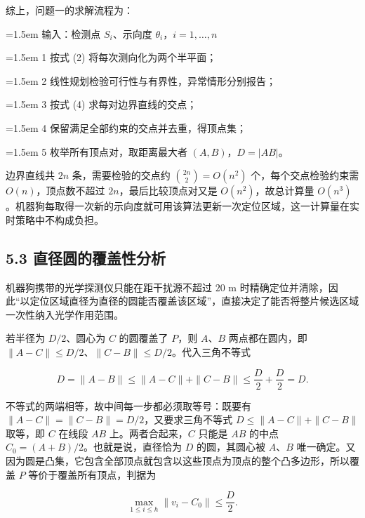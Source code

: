 \documentclass[UTF8,a4paper,zihao=-4,fontset=fandol]{ctexart}
\begin{document}
综上，问题一的求解流程为：

\begin{tcolorbox}[colback=black!2,colframe=black!22,boxrule=0.4pt,arc=0pt,left=9pt,right=9pt,top=7pt,bottom=7pt]
\small\setlength{\parskip}{2pt}
\noindent\hangindent=1.5em 输入：检测点 $S_i$、示向度 $\theta_i$，$i=1,\dots,n$\par
\noindent\hangindent=1.5em 1  按式 (2) 将每次测向化为两个半平面；\par
\noindent\hangindent=1.5em 2  线性规划检验可行性与有界性，异常情形分别报告；\par
\noindent\hangindent=1.5em 3  按式 (4) 求每对边界直线的交点；\par
\noindent\hangindent=1.5em 4  保留满足全部约束的交点并去重，得顶点集；\par
\noindent\hangindent=1.5em 5  枚举所有顶点对，取距离最大者 $(A,B)$，$D=|AB|$。\par
\end{tcolorbox}

边界直线共 $2n$ 条，需要检验的交点约 $\binom{2n}{2}=O(n^2)$ 个，每个交点检验约束需 $O(n)$，顶点数不超过 $2n$，最后比较顶点对又是 $O(n^2)$，故总计算量 $O(n^3)$。机器狗每取得一次新的示向度就可用该算法更新一次定位区域，这一计算量在实时策略中不构成负担。

\subsection*{5.3 直径圆的覆盖性分析}

机器狗携带的光学探测仪只能在距干扰源不超过 $20$ m 时精确定位并清除，因此“以定位区域直径为直径的圆能否覆盖该区域”，直接决定了能否将整片候选区域一次性纳入光学作用范围。

若半径为 $D/2$、圆心为 $C$ 的圆覆盖了 $P$，则 $A$、$B$ 两点都在圆内，即 $\|A-C\|\le D/2$、$\|C-B\|\le D/2$。代入三角不等式

\[
D=\|A-B\|\le\|A-C\|+\|C-B\|\le\frac D2+\frac D2=D .
\]

不等式的两端相等，故中间每一步都必须取等号：既要有 $\|A-C\|=\|C-B\|=D/2$，又要求三角不等式 $D\le\|A-C\|+\|C-B\|$ 取等，即 $C$ 在线段 $AB$ 上。两者合起来，$C$ 只能是 $AB$ 的中点 $C_0=(A+B)/2$。也就是说，直径恰为 $D$ 的圆，其圆心被 $A$、$B$ 唯一确定。又因为圆是凸集，它包含全部顶点就包含以这些顶点为顶点的整个凸多边形，所以覆盖 $P$ 等价于覆盖所有顶点，判据为

\[
\max_{1\le i\le h}\|v_i-C_0\|\le\frac D2 . \tag{6}
\]
\end{document}
